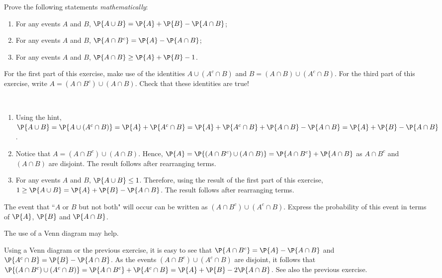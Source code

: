 	\begin{exercise}
		Prove the following statements \emph{mathematically}:
		\begin{enumerate}
			\item For any events $A$ and $B$, $\P{A \cup B} = \P{A} + \P{B} - \P{A \cap B}$;
			\item For any events $A$ and $B$, $\P{A \cap B^c} = \P{A} - \P{A \cap B}$;
			\item For any events $A$ and $B$, $\P{A \cap B} \geq \P{A} + \P{B} - 1$.
		\end{enumerate}
		\begin{hint}
			For the first part of this exercise, make use of the identities $A \cup (A^c \cap B)$ and $B = (A \cap B) \cup (A^c \cap B)$.  For the third part of this exercise, write $A = (A \cap B^c) \cup (A \cap B)$. Check that these identities are true!
		\end{hint}
		\begin{solution}~
			\begin{enumerate}
				\item Using the hint, $\P{A \cup B} = \P{A \cup (A^c \cap B)} = \P{A} + \P{A^c \cap B} = \P{A} + \P{A^c \cap B} + \P{A \cap B} - \P{A \cap B} = \P{A} + \P{B} - \P{A \cap B}$.
				\item Notice that $A = (A \cap B^c) \cup (A \cap B)$. Hence, $\P{A} = \P{(A \cap B^c) \cup (A \cap B)} = \P{A \cap B^c} + \P{A \cap B}$ as $A \cap B^c$ and $(A \cap B)$ are disjoint. The result follows after rearranging terms.
				\item For any events $A$ and $B$, $\P{A \cup B} \leq 1$. Therefore, using the result of the first part of this exercise, $1 \geq \P{A \cup B} = \P{A} + \P{B} - \P{A \cap B}$. The result follows after rearranging terms.
			\end{enumerate}
		\end{solution}
	\end{exercise}
	
	\begin{exercise}
		The event that ``$A$ or $B$ but not both" will occur can be written as $(A \cap B^c) \cup (A^c \cap B)$. Express the probability of this event in terms of $\P{A}$, $\P{B}$ and $\P{A \cap B}$.
		\begin{hint}
			The use of a Venn diagram may help.
		\end{hint}
		\begin{solution}
			Using a Venn diagram or the previous exercise, it is easy to see that $\P{A \cap B^c} = \P{A} - \P{A \cap B}$ and $\P{A^c \cap B} = \P{B} - \P{A \cap B}$. As the events $(A \cap B^c) \cup (A^c \cap B)$ are disjoint, it follows that $\P{(A \cap B^c) \cup (A^c \cap B)} = \P{A \cap B^c} + \P{A^c \cap B} = \P{A} + \P{B} - 2 \P{A \cap B}$. See also the previous exercise.
		\end{solution}
	\end{exercise}
	
